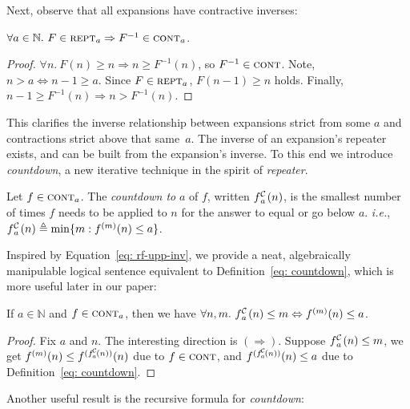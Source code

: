 \noindent Next, observe that all expansions have contractive inverses:
\begin{thm} \label{thm: expansion-inv-contraction}
$\forall a\in \mathbb{N}.~F\in \text{\scshape{rept}}_a \Rightarrow F^{-1} \in \text{\scshape{cont}}_a$.
\end{thm}
\begin{proof}
$\forall n.~F(n)\ge n \Rightarrow n \ge F^{-1}(n)$, so $F^{-1} \in
\text{\scshape{cont}}$. Note, $n > a \iff n-1\ge a$.
Since $F\in \text{\scshape{rept}}_a$, $F(n-1)\ge n$ holds.
Finally, $n-1\ge F^{-1}(n) \Rightarrow n > F^{-1}(n)$.
\end{proof}
\noindent This clarifies the inverse relationship between expansions strict from some $a$ and contractions strict above that same~$a$. The inverse of an expansion's
repeater exists, and can be built from the expansion's inverse.
To this end we introduce \emph{countdown}, a new iterative technique in the
spirit of \emph{repeater}.
\begin{defn} \label{defn: informal-countdown} \label{eq: countdown}
Let $f\in \text{\scshape{cont}}_a$. The \textit{countdown to} $a$ of $f$, \lb written
$\cdt{f}{a}(n)$, is the smallest number of times $f$ needs to be \lb applied to
$n$ for the answer to equal or go below $a$. \lb \emph{i.e.},
$\cdt{f}{a}(n) \triangleq \min\{m: f^{(m)}(n)\le a \}$.
\end{defn}
\noindent Inspired by Equation~\ref{eq: rf-upp-inv}, we provide a neat, algebraically manipulable logical sentence equivalent to Definition~\ref{eq: countdown}, which is more useful later in our paper:
\begin{col} \label{col: cdt-repeat}
If $a \in \mathbb{N}$ and $f\in \text{\scshape{cont}}_{a}$, then we have \lb $\forall n, m.~ \cdt{f}{a}(n)\le m \iff f^{(m)}(n)\le a$.
\end{col}
\begin{proof}
	Fix $a$ and $n$. The interesting direction is $(\Rightarrow)$. Suppose $\cdt{f}{a}(n)\le m$, we get $f^{(m)}(n)\le f^{(\cdt{f}{a}(n))}(n)$ due to $f\in \text{\scshape{cont}}$, and $f^{(\cdt{f}{a}(n))}(n)\le a$ due to Definition~\ref{eq: countdown}.
\end{proof}
\noindent Another useful result is the recursive formula for \emph{countdown}:
